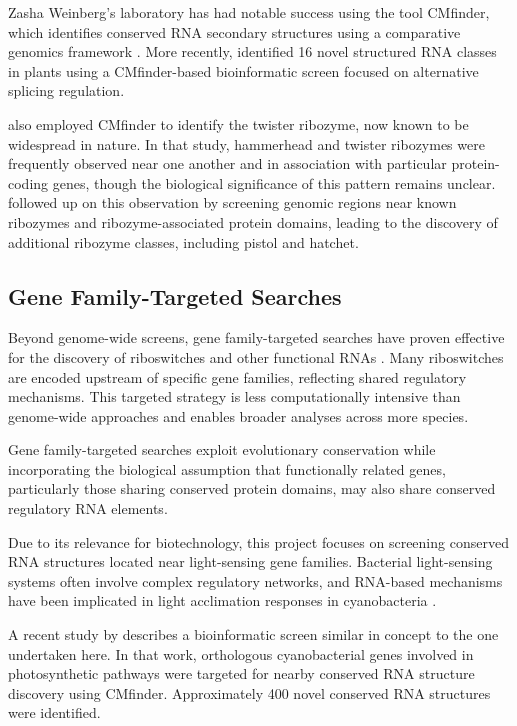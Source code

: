 \documentclass{article}
\begin{document}
Zasha Weinberg's laboratory has had notable success using the tool CMfinder, which identifies conserved RNA secondary structures using a comparative genomics framework \parencite{Yao2006}.
More recently, \textcite{Sack2025} identified 16 novel structured RNA classes in plants using a CMfinder-based bioinformatic screen focused on alternative splicing regulation.

\textcite{Roth2014} also employed CMfinder to identify the twister ribozyme, now known to be widespread in nature.
In that study, hammerhead and twister ribozymes were frequently observed near one another and in association with particular protein-coding genes, though the biological significance of this pattern remains unclear.
\textcite{Weinberg2015} followed up on this observation by screening genomic regions near known ribozymes and ribozyme-associated protein domains, leading to the discovery of additional ribozyme classes, including pistol and hatchet.

\subsection{Gene Family-Targeted Searches}

Beyond genome-wide screens, gene family-targeted searches have proven effective for the discovery of riboswitches and other functional RNAs \parencite{Micura2020, Kavita2023}.
Many riboswitches are encoded upstream of specific gene families, reflecting shared regulatory mechanisms.
This targeted strategy is less computationally intensive than genome-wide approaches and enables broader analyses across more species.

Gene family-targeted searches exploit evolutionary conservation while incorporating the biological assumption that functionally related genes, particularly those sharing conserved protein domains, may also share conserved regulatory RNA elements.

Due to its relevance for biotechnology, this project focuses on screening conserved RNA structures located near light-sensing gene families.
Bacterial light-sensing systems often involve complex regulatory networks, and RNA-based mechanisms have been implicated in light acclimation responses in cyanobacteria \parencite{Hihara2015}.

A recent study by \textcite{Geissler2026} describes a bioinformatic screen similar in concept to the one undertaken here.
In that work, orthologous cyanobacterial genes involved in photosynthetic pathways were targeted for nearby conserved RNA structure discovery using CMfinder.
Approximately 400 novel conserved RNA structures were identified.
\end{document}
